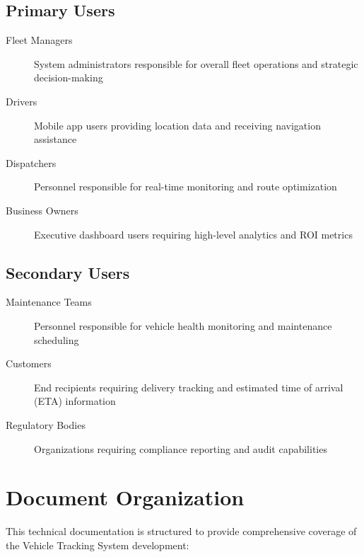 \subsection{Primary Users}
\begin{description}
    \item[Fleet Managers] System administrators responsible for overall fleet operations and strategic decision-making
    \item[Drivers] Mobile app users providing location data and receiving navigation assistance
    \item[Dispatchers] Personnel responsible for real-time monitoring and route optimization
    \item[Business Owners] Executive dashboard users requiring high-level analytics and ROI metrics
\end{description}

\subsection{Secondary Users}
\begin{description}
    \item[Maintenance Teams] Personnel responsible for vehicle health monitoring and maintenance scheduling
    \item[Customers] End recipients requiring delivery tracking and estimated time of arrival (ETA) information
    \item[Regulatory Bodies] Organizations requiring compliance reporting and audit capabilities
\end{description}

\section{Document Organization}
\label{sec:document_organization}

This technical documentation is structured to provide comprehensive coverage of the Vehicle Tracking System development:

